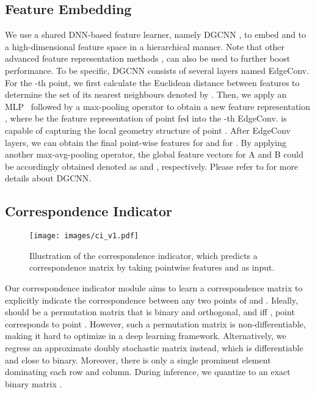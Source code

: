 \documentclass[final]{cvpr}
\begin{document}
\subsection{Feature Embedding} 
We use a shared DNN-based feature learner, namely DGCNN \cite{dgcnn},  to embed   and  to a high-dimensional feature space 
in a hierarchical manner. Note that other advanced feature representation methods \cite{sun2020pointgrow}, \cite{boulch2020convpoint} can also be used to further boost performance.
To be specific, DGCNN consists of several layers named EdgeConv.  
For the -th point, we first calculate the Euclidean distance between features to determine the set of its  nearest neighbours 
denoted by . Then, we apply  
an MLP~\cite{hastie2009elements} followed by a max-pooling operator  to obtain a new feature representation  , where  be the feature representation of point  fed into the -th EdgeConv.   is capable of capturing the local geometry structure of point .  
After  EdgeConv layers, we can obtain the final point-wise features  for  and  for . By applying another max-avg-pooling operator, the global feature vectors for A and B could be accordingly obtained denoted as    and , respectively. Please refer to \cite{dgcnn} for more details about DGCNN. 








\subsection{Correspondence Indicator} 

\begin{figure}[t]
  \centering
  \texttt{[image: images/ci\_v1.pdf]}
  \caption{ Illustration of the correspondence indicator, which predicts a correspondence matrix  by taking  pointwise features  and  as input.}
  \label{fig:ci}
\end{figure}


Our correspondence indicator module aims to learn a correspondence matrix  to explicitly indicate the correspondence between any two points of  and . Ideally,  should be a permutation matrix that is binary and orthogonal, and iff , point  corresponds to point . 
However, such a permutation matrix is non-differentiable, making it hard to optimize in a deep learning framework. Alternatively, we regress an approximate doubly stochastic matrix instead, which is differentiable and close to binary. Moreover,  there is only a single prominent element dominating each row and column. During inference, we quantize  to an exact binary matrix . 
\end{document}
